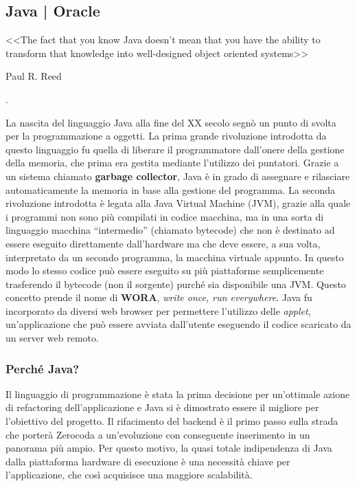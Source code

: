 \subsection{Java | Oracle}
\setlength{\epigraphwidth}{.6\textwidth}
\epigraph{<<The fact that you know Java doesn’t mean that you have the ability to transform that knowledge into well-designed object oriented systems>>}{Paul R. Reed}.

La nascita del linguaggio Java alla fine del XX secolo segnò un punto di svolta per la programmazione a oggetti. La prima grande rivoluzione introdotta da questo linguaggio fu quella di liberare il programmatore dall'onere della gestione della memoria, che prima era gestita mediante l'utilizzo dei puntatori. Grazie a un sistema chiamato \textbf{garbage collector}, Java è in grado di assegnare e rilasciare automaticamente la memoria in base alla gestione del programma. La seconda rivoluzione introdotta è legata alla Java Virtual Machine (JVM), grazie alla quale i programmi non sono più compilati in codice macchina, ma in una sorta di linguaggio macchina “intermedio” (chiamato bytecode) che non è destinato ad essere eseguito direttamente dall’hardware ma che deve essere, a sua volta, interpretato da un secondo programma, la macchina virtuale appunto. In questo modo lo stesso codice può essere eseguito su più piattaforme semplicemente trasferendo il bytecode (non il sorgente) purché sia disponibile una JVM. Questo concetto prende il nome di \textbf{WORA}, \textit{write once, run everywhere}. \cite{reed:developingapplications} Java fu incorporato da diversi web browser per permettere l'utilizzo delle \textit{applet}, un'applicazione che può essere avviata dall'utente eseguendo il codice scaricato da un server web remoto. 

\subsubsection{Perché Java?} Il linguaggio di programmazione è stata la prima decisione per un'ottimale azione di refactoring dell'applicazione e Java si è dimostrato essere il migliore per l'obiettivo del progetto. Il rifacimento del backend è il primo passo sulla strada che porterà Zerocoda a un'evoluzione con conseguente inserimento in un panorama più ampio. Per questo motivo, la quasi totale indipendenza di Java dalla piattaforma hardware di esecuzione è una necessità chiave per l'applicazione, che così acquisisce una maggiore scalabilità. 

